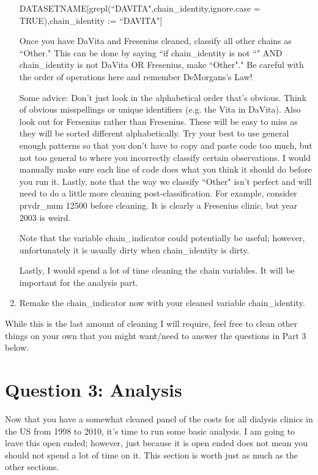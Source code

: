 \documentclass{article}
\begin{document}
\begin{enumerate}
	DATASETNAME[grepl(``DAVITA",chain\_identity,ignore.case = TRUE),chain\_identity := ``DAVITA"]
	
		Once you have DaVita and Fresenius cleaned, classify all other chains as ``Other." This can be done by saying ``if chain\_identity is not ``" AND  chain\_identity is not DaVita OR Fresenius, make ``Other"." Be careful with the order of operations here and remember DeMorgans's Law!
	
		Some advice: Don't just look in the alphabetical order that's obvious. Think of obvious misspellings or unique identifiers (e.g. the Vita in DaVita). Also look out for Fersenius rather than Fresenius. These will be easy to miss as they will be sorted different alphabetically. Try your best to use general enough patterns so that you don't have to copy and paste code too much, but not too general to where you incorrectly classify certain observations. I would manually make sure each line of code does what you think it should do before you run it. Lastly, note that the way we classify ``Other" isn't perfect and will need to do a little more cleaning post-classification. For example, consider prvdr\_num 12500 before cleaning. It is clearly a Fresenius clinic, but year 2003 is weird.
		
		Note that the variable chain\_indicator could potentially be useful; however, unfortunately it is usually dirty when chain\_identity is dirty.
		
		Lastly, I would spend a lot of time cleaning the chain variables. It will be important for the analysis part.
		\item Remake the chain\_indicator now with your cleaned variable chain\_identity.
		\end{enumerate}
		
		While this is the last amount of cleaning I will require, feel free to clean other things on your own that you might want/need to answer the questions in Part 3 below.
		
	\section*{Question 3: Analysis}
	
	Now that you have a somewhat cleaned panel of the costs for all dialysis clinics in the US from 1998 to 2010, it's time to run some basic analysis. I am going to leave this open ended; however, just because it is open ended does not mean you should not spend a lot of time on it. This section is worth just as much as the other sections. 
	
\end{document}
